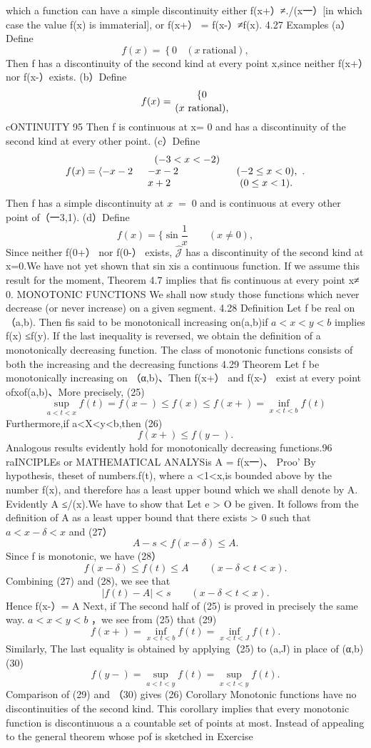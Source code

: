 which a function can have a simple discontinuity either f(x+）≠./(x一）[in which case the value f(x) is immaterial], or f(x+） = f(x-）≠f(x). 4.27 Examples (a）Define $$ f(x)=\left\{0\right.\ \ \ \ (x\ {\mathrm{rational}}), $$ Then f has a discontinuity of the second kind at every point x,since neither f(x+）nor f(x-）exists. (b）Define $$ f(x)={ \{0\atop(x{\mathrm{~rational}}),} $$cONTINUITY 95 Then f is continuous at x= 0 and has a discontinuity of the second kind at every other point. (c）Define $$ f(x)={ \langle-x-2{\quad}\begin{array}{l l}{{\ \ (-3<x<-2)}}\\ {{-x-2}}&{{\ \ (-2\leq x<0),}}\\ {{x+2}}&{{\ \ \ (0\leq x<1).}}\end{array} .} $$ Then f has a simple discontinuity at $\scriptstyle x\;=\;0$ and is continuous at every other point of（一3,1). (d）Define $$ f(x)={ \{\sin{\frac{1}{x}}\quad\quad(x\neq0),} $$ Since neither f(0+） nor f(0-） exists, $\widehat{{\mathcal J}}$ has a discontinuity of the second kind at x=0.We have not yet shown that sin xis a continuous function. If we assume this result for the moment, Theorem 4.7 implies that fis continuous at every point x≠ 0. MONOTONIC FUNCTIONS We shall now study those functions which never decrease (or never increase) on a given segment. 4.28 Definition Let f be real on（a,b). Then fis said to be monotonicall increasing on(a,b)if $a<x<y<b$ implies f(x) ≤f(y). If the last inequality is reversed, we obtain the definition of a monotonically decreasing function. The class of monotonic functions consists of both the increasing and the decreasing functions 4.29 Theorem Let f be monotonically increasing on （α,b)、Then f(x+） and f(x-） exist at every point ofxof(a,b)、More precisely, (25) $$ \operatorname*{sup}_{a<t<x}f(t)=f(x-)\leq f(x)\leq f(x+)=\operatorname*{inf}_{x<t<b}f(t) $$ Furthermore,if a<X<y<b,then (26) $$ f(x+)\leq f(y-). $$ Analogous results evidently hold for monotonically decreasing functions.96 raINCIPLEs or MATHEMATICAL ANALYSis A = f(x一)、 Proo' By hypothesis, theset of numbers.f(t), where a <1<x,is bounded above by the number f(x), and therefore has a least upper bound which we shall denote by A. Evidently A ≤/(x).We have to show that Let e > O be given. It follows from the definition of A as a least upper bound that there exists > 0 such that $a<x-\delta<x$ and (27） $$ A-s<f(x-\delta)\leq A. $$ Since f is monotonic, we have (28） $$ f(x-\delta)\leq f(t)\leq A\qquad(x-\delta<t<x). $$ Combining (27) and (28), we see that $$ |f(t)-A|<s\qquad(x-\delta<t<x). $$ Hence f(x-）= A Next, if The second half of (25) is proved in precisely the same way. $a<x<y<b$ ，we see from (25) that (29) $$ f(x+)=\operatorname*{inf}_{x<t<b}f(t)=\operatorname*{inf}_{x<t<J}f(t). $$ Similarly, The last equality is obtained by applying（25) to (a,J) in place of (α,b) (30) $$ f(y-)=\operatorname*{sup}_{a<t<y}f(t)=\operatorname*{sup}_{x<t<y}f(t). $$ Comparison of (29) and （30) gives (26) Corollary Monotonic functions have no discontinuities of the second kind. This corollary implies that every monotonic function is discontinuous a a countable set of points at most. Instead of appealing to the general theorem whose pof is sketched in Exercise 
